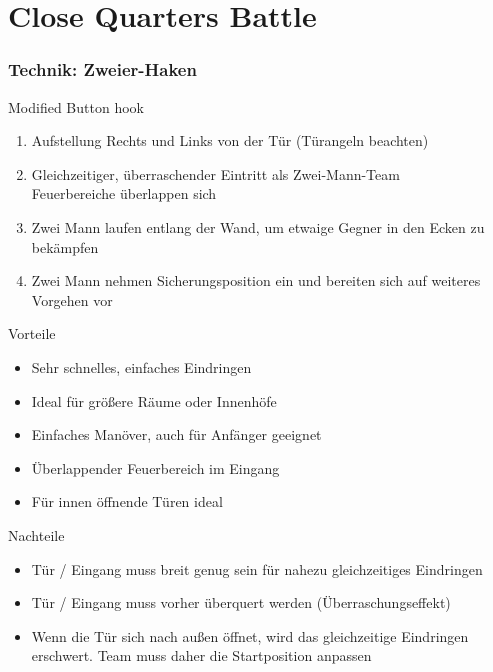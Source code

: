 \pagebreak
\chapter{Close Quarters Battle}
\label{CQB}
\subsection{Technik: Zweier-Haken}
\begin{center}
	Modified Button hook
\end{center}
\begin{enumerate}
	\item Aufstellung Rechts und Links von der Tür (Türangeln beachten)
	\item Gleichzeitiger, überraschender Eintritt als Zwei-Mann-Team \\
		Feuerbereiche überlappen sich
	\item Zwei Mann laufen entlang der Wand, um etwaige Gegner in den Ecken zu bekämpfen
	\item Zwei Mann nehmen Sicherungsposition ein und bereiten sich auf weiteres Vorgehen vor
 \end{enumerate}        
 Vorteile
 \begin{itemize}
	 \item Sehr schnelles, einfaches Eindringen
	 \item Ideal für größere Räume oder Innenhöfe
	 \item Einfaches Manöver, auch für Anfänger geeignet
	 \item Überlappender Feuerbereich im Eingang
	 \item Für innen öffnende Türen ideal
 \end{itemize}     
  Nachteile
  \begin{itemize}
  	\item Tür / Eingang muss breit genug sein für nahezu gleichzeitiges Eindringen
  	\item Tür / Eingang muss vorher überquert werden (Überraschungseffekt)
  	\item Wenn die Tür sich nach außen öffnet, wird das gleichzeitige Eindringen erschwert. Team muss daher die Startposition anpassen
  \end{itemize}          
